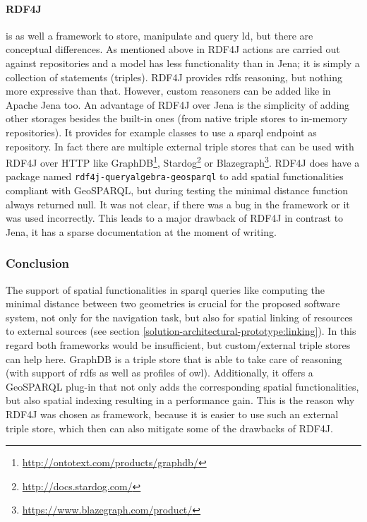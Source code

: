 \documentclass[draft,final]{vutinfth} %
\begin{document}
\paragraph{RDF4J} is as well a framework to store, manipulate and query \gls{ld}, but there are conceptual differences. As mentioned above in RDF4J actions are carried out against repositories and a model has less functionality than in Jena; it is simply a collection of statements (triples). RDF4J provides \gls{rdfs} reasoning, but nothing more expressive than that. However, custom reasoners can be added like in Apache Jena too. An advantage of RDF4J over Jena is the simplicity of adding other storages besides the built-in ones (from native triple stores to in-memory repositories). It provides for example classes to use a \gls{sparql} endpoint as repository. In fact there are multiple external triple stores that can be used with RDF4J over HTTP like GraphDB\footnote{\url{http://ontotext.com/products/graphdb/}}, Stardog\footnote{\url{http://docs.stardog.com/}} or Blazegraph\footnote{\url{https://www.blazegraph.com/product/}}. RDF4J does have a package named \texttt{rdf4j-queryalgebra-geosparql} to add spatial functionalities compliant with GeoSPARQL, but during testing the minimal distance function always returned null. It was not clear, if there was a bug in the framework or it was used incorrectly. This leads to a major drawback of RDF4J in contrast to Jena, it has a sparse documentation at the moment of writing.

\subsubsection{Conclusion}

The support of spatial functionalities in \gls{sparql} queries like computing the minimal distance between two geometries is crucial for the proposed software system, not only for the navigation task, but also for spatial linking of resources to external sources (see section \ref{solution-architectural-prototype:linking}). In this regard both frameworks would be insufficient, but custom/external triple stores can help here. GraphDB is a triple store that is able to take care of reasoning (with support of \gls{rdfs} as well as profiles of \gls{owl}). Additionally, it offers a GeoSPARQL plug-in that not only adds the corresponding spatial functionalities, but also spatial indexing resulting in a performance gain. This is the reason why RDF4J was chosen as framework, because it is easier to use such an external triple store, which then can also mitigate some of the drawbacks of RDF4J.
\end{document}
